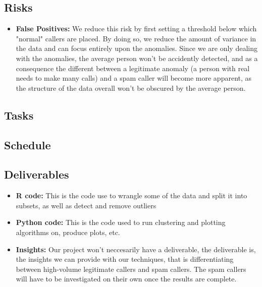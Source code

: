 \documentclass[20pt]{article} %
\begin{document}
\subsection{Risks}
\begin{itemize}
\item \textbf{False Positives:} We reduce this risk by first setting a threshold below which "normal" callers are placed.  By doing so, we reduce the amount of variance in the data and can focus entirely upon the anomalies.  Since we are only dealing with the anomalies, the average person won't be accidently detected, and as a consequence the different between a legitimate anomaly (a person with real needs to make many calls) and a spam caller will become more apparent, as the structure of the data overall won't be obscured by the average person.
\end{itemize}
\subsection{Tasks}

\subsection{Schedule}

\subsection{Deliverables}
\begin{itemize}
\item \textbf{R code:} This is the code use to wrangle some of the data and split it into subsets, as well as detect and remove outliers
\item \textbf{Python code:} This is the code used to run clustering and plotting algorithms on, produce plots, etc.
\item \textbf{Insights:} Our project won't neccesarily have a deliverable, the deliverable is, the insights we can provide with our techniques, that is differentiating between high-volume legitimate callers and spam callers.  The spam callers will have to be investigated on their own once the results are complete.
\end{itemize}
\end{document}
